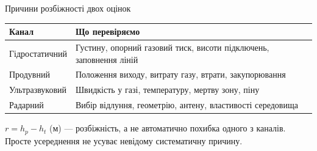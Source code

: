 \documentclass[aspectratio=169,11pt]{beamer}
\begin{document}
\begin{frame}{Причини розбіжності двох оцінок}
\begin{tabular}{p{}p{}}\toprule
Канал & Що перевіряємо \\\midrule
Гідростатичний & Густину, опорний газовий тиск, висоти підключень, заповнення ліній \\
Продувний & Положення виходу, витрату газу, втрати, закупорювання \\
Ультразвуковий & Швидкість у газі, температуру, мертву зону, піну \\
Радарний & Вибір відлуння, геометрію, антену, властивості середовища \\\bottomrule
\end{tabular}
\medskip
$r=h_p-h_t$ (м) --- розбіжність, а не автоматично похибка одного з каналів. Просте усереднення не усуває невідому систематичну причину.
\end{frame}
\end{document}
